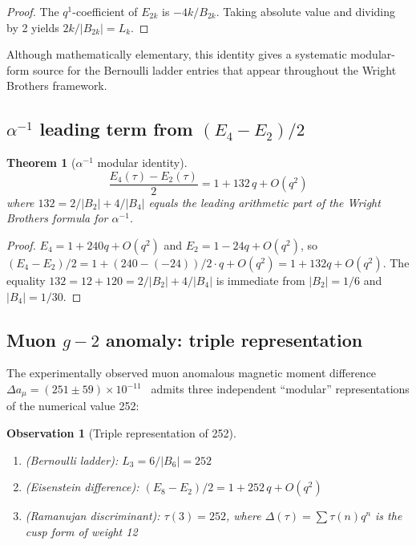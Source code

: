 \documentclass[11pt,a4paper]{article}
\newtheorem{theorem}{Theorem}
\newtheorem{observation}{Observation}
\begin{document}
\begin{proof}
The $q^1$-coefficient of $E_{2k}$ is $-4k/B_{2k}$. Taking absolute value
and dividing by 2 yields $2k/|B_{2k}| = L_k$.
\end{proof}

Although mathematically elementary, this identity gives a systematic
modular-form source for the Bernoulli ladder entries that appear
throughout the Wright Brothers framework.

\subsection{$\alpha^{-1}$ leading term from $(E_4 - E_2)/2$}

\begin{theorem}[$\alpha^{-1}$ modular identity]
\label{th:alpha}
\begin{equation}
\frac{E_4(\tau) - E_2(\tau)}{2} = 1 + 132\, q + O(q^2)
\end{equation}
where $132 = 2/|B_2| + 4/|B_4|$ equals the leading arithmetic part
of the Wright Brothers formula for $\alpha^{-1}$.
\end{theorem}

\begin{proof}
$E_4 = 1 + 240q + O(q^2)$ and $E_2 = 1 - 24q + O(q^2)$, so
$(E_4 - E_2)/2 = 1 + (240 - (-24))/2 \cdot q + O(q^2) = 1 + 132q + O(q^2)$.
The equality $132 = 12 + 120 = 2/|B_2| + 4/|B_4|$ is immediate from
$|B_2| = 1/6$ and $|B_4| = 1/30$.
\end{proof}

\subsection{Muon $g-2$ anomaly: triple representation}

The experimentally observed muon anomalous magnetic moment difference
$\Delta a_\mu = (251 \pm 59)\times 10^{-11}$~\cite{MuonG2FNAL, BMW2021}
admits three independent ``modular'' representations of the numerical
value 252:

\begin{observation}[Triple representation of 252]
\label{obs:muon}
\begin{enumerate}
\item (Bernoulli ladder): $L_3 = 6/|B_6| = 252$
\item (Eisenstein difference):
$(E_8 - E_2)/2 = 1 + 252\,q + O(q^2)$
\item (Ramanujan discriminant): $\tau(3) = 252$, where
$\Delta(\tau) = \sum \tau(n)q^n$ is the cusp form of weight 12
\end{enumerate}
\end{observation}
\end{document}
